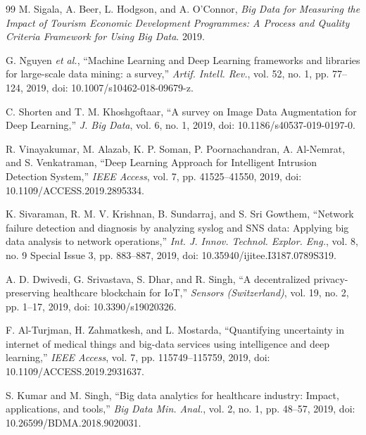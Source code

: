 \documentclass[10pt,a4paper]{article}
\begin{document}
\vspace{6pt}
\begingroup
\renewcommand{\section}[2]{}%
\begin{thebibliography}{99}
\fontsize{8pt}{10pt}\selectfont
{}
M. Sigala, A. Beer, L. Hodgson, and A. O'Connor, \textit{Big Data for Measuring the Impact of Tourism Economic Development Programmes: A Process and Quality Criteria Framework for Using Big Data}. 2019.

G. Nguyen \textit{et al.}, ``Machine Learning and Deep Learning frameworks and libraries for large-scale data mining: a survey,'' \textit{Artif. Intell. Rev.}, vol. 52, no. 1, pp. 77--124, 2019, doi: 10.1007/s10462-018-09679-z.

C. Shorten and T. M. Khoshgoftaar, ``A survey on Image Data Augmentation for Deep Learning,'' \textit{J. Big Data}, vol. 6, no. 1, 2019, doi: 10.1186/s40537-019-0197-0.

R. Vinayakumar, M. Alazab, K. P. Soman, P. Poornachandran, A. Al-Nemrat, and S. Venkatraman, ``Deep Learning Approach for Intelligent Intrusion Detection System,'' \textit{IEEE Access}, vol. 7, pp. 41525--41550, 2019, doi: 10.1109/ACCESS.2019.2895334.

K. Sivaraman, R. M. V. Krishnan, B. Sundarraj, and S. Sri Gowthem, ``Network failure detection and diagnosis by analyzing syslog and SNS data: Applying big data analysis to network operations,'' \textit{Int. J. Innov. Technol. Explor. Eng.}, vol. 8, no. 9 Special Issue 3, pp. 883--887, 2019, doi: 10.35940/ijitee.I3187.0789S319.

A. D. Dwivedi, G. Srivastava, S. Dhar, and R. Singh, ``A decentralized privacy-preserving healthcare blockchain for IoT,'' \textit{Sensors (Switzerland)}, vol. 19, no. 2, pp. 1--17, 2019, doi: 10.3390/s19020326.

F. Al-Turjman, H. Zahmatkesh, and L. Mostarda, ``Quantifying uncertainty in internet of medical things and big-data services using intelligence and deep learning,'' \textit{IEEE Access}, vol. 7, pp. 115749--115759, 2019, doi: 10.1109/ACCESS.2019.2931637.

S. Kumar and M. Singh, ``Big data analytics for healthcare industry: Impact, applications, and tools,'' \textit{Big Data Min. Anal.}, vol. 2, no. 1, pp. 48--57, 2019, doi: 10.26599/BDMA.2018.9020031.


\end{thebibliography}
\end{document}
